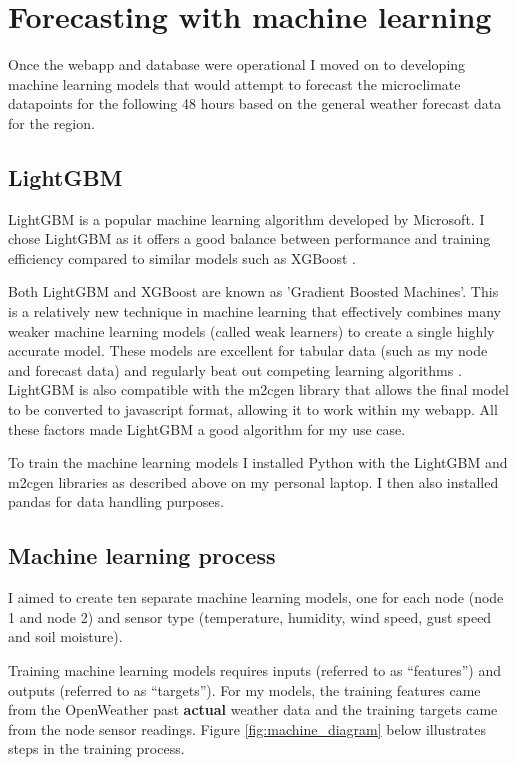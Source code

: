 \section{Forecasting with machine learning}

Once the webapp and database were operational I moved on to developing machine
learning models that would attempt to forecast the microclimate datapoints for
the following 48 hours based on the general weather forecast data for the
region.
\subsection{LightGBM}

LightGBM is a popular machine learning algorithm developed by Microsoft. I chose
LightGBM as it offers a good balance between performance and training efficiency
compared to similar models such as XGBoost \cite{saha2025}.

Both LightGBM and XGBoost are known as 'Gradient Boosted Machines'. This is a
relatively new technique in machine learning that effectively combines many
weaker machine learning models (called weak learners) to create a single highly
accurate model. These models are excellent for tabular data (such as my node and
forecast data) and regularly beat out competing learning algorithms
\cite{tuychiev2023}. LightGBM is also compatible with the m2cgen library that
allows the final model to be converted to javascript format, allowing it to work
within my webapp. All these factors made LightGBM a good algorithm for my use
case.

To train the machine learning models I installed Python with the LightGBM and
m2cgen libraries as described above on my personal laptop. I then also installed
pandas for data handling purposes.

\subsection{Machine learning process}

I aimed to create ten separate machine learning models, one for each node (node
1 and node 2) and sensor type (temperature, humidity, wind speed, gust speed and
soil moisture).

Training machine learning models requires inputs (referred to as “features”) and
outputs (referred to as “targets”).  For my models, the training features came
from the OpenWeather past \textbf{actual} weather data and the training targets
came from the node sensor readings. Figure \ref{fig:machine_diagram} below
illustrates steps in the training process.

